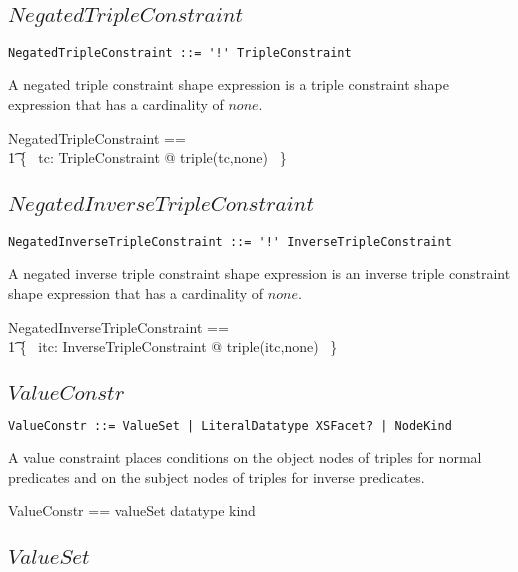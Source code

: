 \documentclass{article}
\begin{document}
\subsection{$NegatedTripleConstraint$}

\begin{verbatim}
NegatedTripleConstraint ::= '!' TripleConstraint
\end{verbatim}

A negated triple constraint shape expression is a triple constraint shape expression that has a cardinality of $none$.
\begin{zed}
	NegatedTripleConstraint == \\
\t1		\{~ tc: TripleConstraint @ triple(tc,none) ~\}
\end{zed}

\subsection{$NegatedInverseTripleConstraint$}

\begin{verbatim}
NegatedInverseTripleConstraint ::= '!' InverseTripleConstraint
\end{verbatim}

A negated inverse triple constraint shape expression is an inverse triple constraint shape expression that has a cardinality of $none$.
\begin{zed}
	NegatedInverseTripleConstraint == \\
\t1		\{~ itc: InverseTripleConstraint @ triple(itc,none) ~\}
\end{zed}

\subsection{$ValueConstr$}

\begin{verbatim}
ValueConstr ::= ValueSet | LiteralDatatype XSFacet? | NodeKind
\end{verbatim}

A value constraint places conditions on the object nodes of triples for normal predicates
and on the subject nodes of triples for inverse predicates.
\begin{zed}
	ValueConstr == \ran valueSet \cup \ran datatype \cup \ran kind
\end{zed}

\subsection{$ValueSet$}
\end{document}
